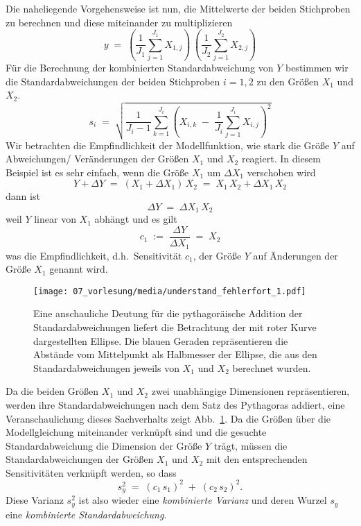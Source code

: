 Die naheliegende Vorgehensweise ist nun, die Mittelwerte der beiden Stichproben zu berechnen und
diese miteinander zu multiplizieren
\begin{equation}
y \; = \; \left(\frac{1}{J_1} \sum_{j=1}^{J_1} X_{1,j}\right) \,
          \left(\frac{1}{J_2} \sum_{j=1}^{J_2} X_{2,j}\right)
\end{equation}
Für die Berechnung der kombinierten Standardabweichung von $Y$ bestimmen wir
die Standardabweichungen der beiden Stichproben $i = 1,2$ zu den Größen $X_1$ und $X_2$.
\begin{equation}
s_i \; = \; \sqrt{ \frac{1}{J_i - 1} \sum_{k=1}^{J_i}
 \left( X_{i,k} \; - \; \frac{1}{J_i} \sum_{j=1}^{J_i} X_{i,j}\right)^2 }
\end{equation}
Wir betrachten die Empfindlichkeit der Modellfunktion, wie stark die Größe $Y$ auf
Abweichungen/ Veränderungen der Größen $X_1$ und $X_2$ reagiert.
In diesem Beispiel ist es sehr einfach, wenn die Größe $X_1$ um $\Delta X_1$ verschoben wird
\begin{equation}
Y + \Delta Y \; = \; (X_1 + \Delta X_1) \, X_2 \; = \; X_1\, X_2 + \Delta X_1 \, X_2
\end{equation}
dann ist
\begin{equation}
\Delta Y \; = \; \Delta X_1 \, X_2
\end{equation}
weil $Y$ linear von $X_1$ abhängt und es gilt
\begin{equation}
c_1 \; := \; \frac{\Delta Y}{\Delta X_1} \; = \; X_2
\end{equation}
was die Empfindlichkeit, d.h.\ Sensitivität $c_1$, der Größe $Y$ auf Änderungen der Größe
$X_1$ genannt wird.
\begin{figure}
\begin{center}
\texttt{[image: 07\_vorlesung/media/understand\_fehlerfort\_1.pdf]}
\caption{\label{FortpfElliptisch} Eine anschauliche Deutung für die pythagoräische
Addition der Standardabweichungen liefert die Betrachtung der mit roter Kurve dargestellten
Ellipse. Die blauen Geraden repräsentieren die Abstände vom Mittelpunkt als Halbmesser
der Ellipse, die aus den Standardabweichungen jeweils von $X_1$ und $X_2$ berechnet wurden.}
\end{center}
\end{figure}
Da die beiden Größen $X_1$ und $X_2$ zwei unabhängige Dimensionen repräsentieren, werden
ihre Standardabweichungen nach dem Satz des Pythagoras addiert, eine Veranschaulichung dieses
Sachverhalts zeigt Abb.~\ref{FortpfElliptisch}. Da die Größen über die Modellgleichung
miteinander verknüpft sind und die gesuchte Standardabweichung die Dimension der Größe $Y$
trägt, müssen die Standardabweichungen der Größen $X_1$ und $X_2$ mit den entsprechenden
Sensitivitäten verknüpft werden, so dass
\begin{equation}
s_y^2 \; = \; (c_1 \, s_1)^2 \; + \; (c_2 \, s_2)^2 .
\end{equation}
Diese Varianz $s_y^2$ ist also wieder eine \textsl{kombinierte Varianz} und deren Wurzel
$s_y$ eine \textsl{kombinierte Standardabweichung}.

